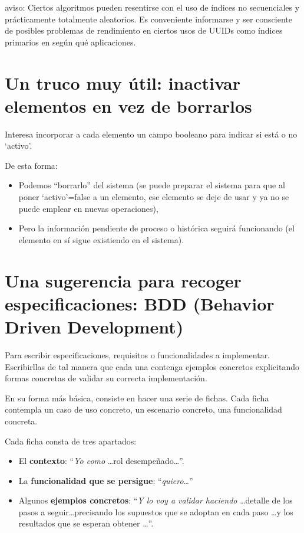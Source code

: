 \documentclass[spanish,12pt,a4paper,final,oneside]{book}
\begin{document}
\vspace{1cm}

aviso: Ciertos algoritmos pueden resentirse con el uso de índices no secuenciales y prácticamente totalmente aleatorios. Es conveniente informarse y ser consciente de posibles problemas de rendimiento en ciertos usos de UUIDs como índices primarios en según qué aplicaciones. 

\newpage

\section{Un truco muy útil: inactivar elementos en vez de borrarlos}
Interesa incorporar a cada elemento un campo booleano para indicar si está o no `activo'.

De esta forma:
\begin{itemize}
\item Podemos ``borrarlo'' del sistema (se puede preparar el sistema para que al poner `activo'=false a un elemento, ese elemento se deje de usar y ya no se puede emplear en nuevas operaciones),
\item Pero la información pendiente de proceso o histórica seguirá funcionando (el elemento en sí sigue existiendo en el sistema).
\end{itemize}


\section{Una sugerencia para recoger especificaciones: BDD (Behavior Driven Development)}

Para escribir especificaciones, requisitos o funcionalidades a implementar. Escribirllas de tal manera que cada una contenga ejemplos concretos explicitando formas concretas de validar su correcta implementación.

En su forma más básica, consiste en hacer una serie de fichas. Cada ficha contempla un caso de uso concreto, un escenario concreto, una funcionalidad concreta. 

Cada ficha consta de tres apartados:
\begin{itemize}

\item El \textbf{contexto}: ``\textit{Yo como} \ldots rol desempeñado\ldots''. 

\item La \textbf{funcionalidad que se persigue}: ``\textit{quiero}\ldots''

\item Algunos \textbf{ejemplos concretos}: ``\textit{Y lo voy a validar haciendo} \ldots detalle de los pasos a seguir\ldots precisando los supuestos que se adoptan en cada paso \ldots y los resultados que se esperan obtener \ldots''.

\end{itemize}
\end{document}
